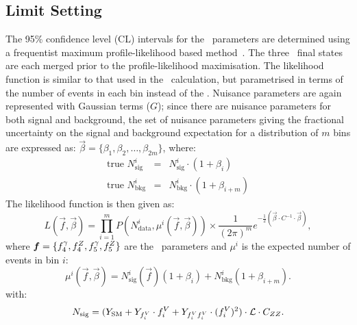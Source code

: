 \subsection{Limit Setting}

The 95\% confidence level (CL) intervals for the \TGC\ parameters are determined
using a frequentist maximum profile-likelihood based method~\cite{Cowan:2010js}.
The three \lllplp\ final states are each merged prior to
the profile-likelihood maximisation. The likelihood function is similar
to that used in the \cx\ calculation, but parametrised in terms of the
number of events in each bin instead of the \cx.  Nuisance parameters are
again represented with Gaussian terms ($G$); since there are nuisance
parameters for both signal and background, the set of nuisance parameters giving
the fractional uncertainty on the signal and background expectation for a
distribution of $m$ bins are expressed as:
$\vec\beta = \{\beta_1, \beta_2, \ldots, \beta_{2m}\}$, where:
\begin{eqnarray}
\text{true }N_\mathrm{sig}^i &=& N_\mathrm{sig}^i \cdot (1 + \beta_i) \label{nuis1}\\
\text{true }N_\mathrm{bkg}^i &=& N_\mathrm{bkg}^i \cdot (1 + \beta_{i+m}) \label{nuis2}
\end{eqnarray}
The likelihood function is then given as:
\begin{equation}
L(\vec{f}, \vec{\beta}) =
\prod_{i=1}^{m}P(N_\mathrm{data}^i,\mu^i(\vec{f},\vec\beta))
\times
\frac{1}{(2\pi)^m}e^{-\frac{1}{2}\left(\vec\beta\cdot C^{-1}\cdot\vec\beta\right)},
\label{likelihood}
\end{equation}
where $\boldsymbol{f}=\{f_{4}^{\gamma}, f_{4}^{Z}, f_{5}^{\gamma}, f_{5}^{Z} \}$ are the \TGC\
parameters and $\mu^{i}$ is the expected number of events in bin $i$:
\begin{equation}
\mu^i(\vec{f},\vec{\beta})
= N_\mathrm{sig}^i(\vec{f})(1 + \beta_i) + N_\mathrm{bkg}^i(1 + \beta_{i+m}).
\end{equation}
with:
\begin{equation}
N_{\rm sig} = (Y_\mathrm{\rm SM} + Y_{f_i^V}\cdot f_i^V + Y_{f_i^Vf_i^V}\cdot (f_i^V)^2)\cdot\mathcal{L}\cdot{C_{ZZ}}.
\end{equation}

